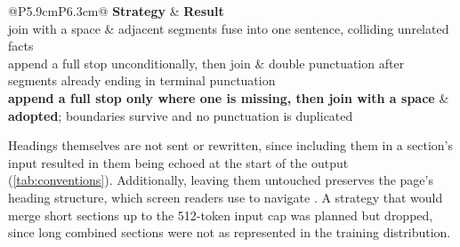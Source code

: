 \begin{table}[htbp]
	\centering
	\small
	\setlength{\tabcolsep}{4pt}
	\caption{Segment-Join Strategies and Their Failure Modes}
	\label{tab:joins}
	\begin{tabular}{@{}P{5.9cm}P{6.3cm}@{}}
		\toprule
		\textbf{Strategy}                                                             & \textbf{Result}                                                          \\
		\midrule
		join with a space                                                             & adjacent segments fuse into one sentence, colliding unrelated facts      \\
		append a full stop unconditionally, then join                                 & double punctuation after segments already ending in terminal punctuation \\
		\textbf{append a full stop only where one is missing, then join with a space} & \textbf{adopted}; boundaries survive and no punctuation is duplicated    \\
		\bottomrule
	\end{tabular}
\end{table}

\pagebreak

Headings themselves are not sent or rewritten, since including them in a section's input resulted in them being echoed at the start of the output (\cref{tab:conventions}).
Additionally, leaving them untouched preserves the page's heading structure, which screen readers use to navigate \parencite[519]{hellbusch2018webdesign}.
A strategy that would merge short sections up to the \num{512}-token input cap was planned but dropped, since long combined sections were not as represented in the training distribution.

